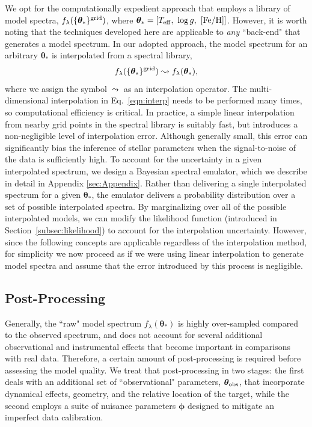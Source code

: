 \documentclass[iop,floatfix,numberedappendix,twocolappendix]{emulateapj}
\newcommand{\flam}{f_\lambda}
\newcommand{\vt}{ {\bm \theta}}
\newcommand{\vp}{ {\bm \phi}}
\begin{document}
We opt for the computationally expedient approach that employs a library of model spectra, 
$\flam(\{\vt_{\ast}\}^{\rm grid})$, where $\vt_{\ast} = [T_{\rm eff}, \,\, \log{g}, \,\, 
[{\rm Fe/H}]]$.  However, it is worth noting that the techniques developed here are applicable to 
{\it any} ``back-end" that generates a model spectrum.  In our adopted approach, the model spectrum 
for an arbitrary $\vt_{\ast}$ is interpolated from a spectral library,
\begin{equation} \label{eqn:interp} 
\flam(\{\vt_{\ast}\}^{\rm grid}) \leadsto \flam(\vt_{\ast}), 
\end{equation} 
where we assign the symbol $\leadsto$ as an interpolation operator.  The multi-dimensional
interpolation in Eq.~\ref{eqn:interp} needs to be performed many times, so computational efficiency
is critical.  In practice, a simple linear interpolation from nearby grid points in the spectral
library is suitably fast, but introduces a non-negligible level of interpolation error. Although
generally small, this error can significantly bias the inference of stellar parameters
when the signal-to-noise of the data is sufficiently high. To account for the uncertainty in a given
interpolated spectrum, we design a Bayesian spectral emulator, which we describe in detail in
Appendix \ref{sec:Appendix}. Rather than delivering a single interpolated spectrum for a given
$\vt_\ast$, the emulator delivers a probability distribution over a set of possible interpolated
spectra. By marginalizing over all of the possible interpolated models, we can modify the likelihood
function (introduced in Section~\ref{subsec:likelihood}) to account for the interpolation
uncertainty. However, since the following concepts are applicable regardless of the interpolation
method, for simplicity we now proceed as if we were using linear interpolation to generate model spectra
and assume that the error introduced by this process is negligible. 

\subsection{Post-Processing} \label{subsec:postprocess}

Generally, the ``raw" model spectrum $\flam(\vt_{\ast})$ is highly over-sampled compared to the 
observed spectrum, and does not account for several additional observational and instrumental 
effects that become important in comparisons with real data.  Therefore, a certain amount of 
post-processing is required before assessing the model quality.  We treat that post-processing in 
two stages: the first deals with an additional set of ``observational" parameters, $\vt_{\rm obs}$, 
that incorporate dynamical effects, geometry, and the relative location of the target, while the 
second employs a suite of nuisance parameters $\vp$ designed to mitigate an imperfect 
data calibration.
\end{document}
